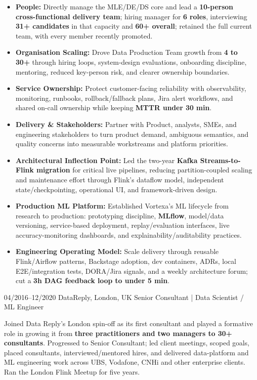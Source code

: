 \documentclass[]{../../../../friggeri-cv}
\begin{document}
\begin{entrylist}
{{        }
        \begin{itemize}[leftmargin=1.1em]
            \item \footnotesize\textbf{People:} Directly manage the MLE/DE/DS core and lead a \textbf{10-person cross-functional delivery team}; hiring manager for \textbf{6 roles}, interviewing \textbf{31+ candidates} in that capacity and \textbf{60+ overall}; retained the full current team, with every member recently promoted.
            \item \footnotesize\textbf{Organisation Scaling:} Drove Data Production Team growth from \textbf{4 to 30+} through hiring loops, system-design evaluations, onboarding discipline, mentoring, reduced key-person risk, and clearer ownership boundaries.
            \item \footnotesize\textbf{Service Ownership:} Protect customer-facing reliability with observability, monitoring, runbooks, rollback/fallback plans, Jira alert workflows, and shared on-call ownership while keeping \textbf{MTTR under 30 min}.
            \item \footnotesize\textbf{Delivery \& Stakeholders:} Partner with Product, analysts, SMEs, and engineering stakeholders to turn product demand, ambiguous semantics, and quality concerns into measurable workstreams and platform priorities.
            \item \footnotesize\textbf{Architectural Inflection Point:} Led the two-year \textbf{Kafka Streams-to-Flink migration} for critical live pipelines, reducing partition-coupled scaling and maintenance effort through Flink's dataflow model, independent state/checkpointing, operational UI, and framework-driven design.
            \item \footnotesize\textbf{Production ML Platform:} Established Vortexa's ML lifecycle from research to production: prototyping discipline, \textbf{MLflow}, model/data versioning, service-based deployment, replay/evaluation interfaces, live accuracy-monitoring dashboards, and explainability/auditability practices.
            \item \footnotesize\textbf{Engineering Operating Model:} Scale delivery through reusable Flink/Airflow patterns, Backstage adoption, dev containers, ADRs, local E2E/integration tests, DORA/Jira signals, and a weekly architecture forum; cut a \textbf{3h DAG feedback loop to under 5 min}.
        \end{itemize}
    }
    \entry
    {04/2016--12/2020}
    {DataReply, London, UK}
    {Senior Consultant | Data Scientist / ML Engineer}
    {
        {\small
        \setlength{\parindent}{0pt}
        \setlength{\leftskip}{0pt}
        Joined Data Reply's London spin-off as its first consultant and played a formative role in growing it from \textbf{three practitioners and two managers to 30+ consultants}. Progressed to Senior Consultant; led client meetings, scoped goals, placed consultants, interviewed/mentored hires, and delivered data-platform and ML engineering work across UBS, Vodafone, CNHi and other enterprise clients. Ran the London Flink Meetup for five years.

}}
\end{entrylist}
\end{document}
